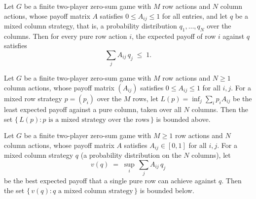 \begin{lemma}
\label{OnlineLearning.pureVsPayoff_le_one}
\leanok
{}
Let $G$ be a finite two-player zero-sum game with $M$ row actions and $N$ column
actions, whose payoff matrix $A$ satisfies $0 \le A_{ij} \le 1$ for all entries, and let
$q$ be a mixed column strategy, that is, a probability distribution $q_1, \dots, q_N$
over the columns. Then for every pure row action $i$, the expected payoff of row $i$
against $q$ satisfies
\[
  \sum_{j} A_{ij}\, q_j \;\le\; 1.
\]
\end{lemma}

\begin{lemma}
\label{OnlineLearning.finiteLowerValue_bddAbove}
\leanok
{}
Let $G$ be a finite two-player zero-sum game with $M$ row actions and $N \ge 1$ column
actions, whose payoff matrix $(A_{ij})$ satisfies $0 \le A_{ij} \le 1$ for all $i,j$.
For a mixed row strategy $p = (p_i)$ over the $M$ rows, let $L(p) = \inf_{j} \sum_i p_i
A_{ij}$ be the least expected payoff against a pure column, taken over all $N$ columns.
Then the set $\{\, L(p) : p \text{ is a mixed strategy over the rows} \,\}$ is bounded
above.
\end{lemma}

\begin{lemma}
\label{OnlineLearning.finiteUpperValue_bddBelow}
\leanok
{}
Let $G$ be a finite two-player zero-sum game with $M \ge 1$ row actions and $N$ column
actions, whose payoff matrix $A$ satisfies $A_{ij} \in [0,1]$ for all $i,j$. For a mixed
column strategy $q$ (a probability distribution on the $N$ columns), let
\[
  v(q) \;=\; \sup_{i}\, \sum_{j} A_{ij}\, q_j
\]
be the best expected payoff that a single pure row can achieve against $q$. Then the set
$\{\, v(q) : q \text{ a mixed column strategy}\,\}$ is bounded below.
\end{lemma}

